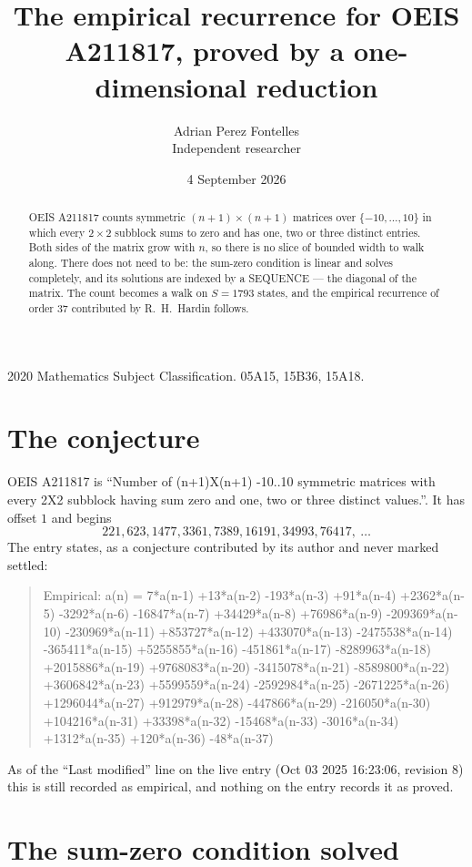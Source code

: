 \documentclass[11pt,a4paper]{article}
\title{The empirical recurrence for OEIS A211817, proved by a one-dimensional reduction}
\author{Adrian Perez Fontelles\\ \small Independent researcher}
\date{4 September 2026}
\theoremstyle{plain}
\theoremstyle{definition}
\begin{document}
\maketitle

\begin{abstract}
OEIS A211817 counts symmetric $(n+1)\times(n+1)$ matrices over
$\{-10,\dots,10\}$ in which every $2\times2$ subblock sums to zero and has one, two or three distinct
entries. Both sides of the matrix grow with $n$, so there is no slice of bounded width to walk
along. There does not need to be: the sum-zero condition is linear and solves completely, and
its solutions are indexed by a SEQUENCE --- the diagonal of the matrix. The count becomes a walk
on $S=1793$ states, and the empirical recurrence of order $37$ contributed by R.~H.~Hardin
follows.
\end{abstract}

\noindent\small 2020 Mathematics Subject Classification. 05A15, 15B36, 15A18.\normalsize

\section{The conjecture}

OEIS A211817 is ``Number of (n+1)X(n+1) -10..10 symmetric matrices with every 2X2 subblock having sum zero and one, two or three distinct values.''. It has offset $1$ and begins
\[
221, 623, 1477, 3361, 7389, 16191, 34993, 76417,\ \dots
\]
The entry states, as a conjecture contributed by its author and never marked settled:
\begin{quote}
Empirical: a(n) = 7*a(n-1) +13*a(n-2) -193*a(n-3) +91*a(n-4) +2362*a(n-5) -3292*a(n-6) -16847*a(n-7) +34429*a(n-8) +76986*a(n-9) -209369*a(n-10) -230969*a(n-11) +853727*a(n-12) +433070*a(n-13) -2475538*a(n-14) -365411*a(n-15) +5255855*a(n-16) -451861*a(n-17) -8289963*a(n-18) +2015886*a(n-19) +9768083*a(n-20) -3415078*a(n-21) -8589800*a(n-22) +3606842*a(n-23) +5599559*a(n-24) -2592984*a(n-25) -2671225*a(n-26) +1296044*a(n-27) +912979*a(n-28) -447866*a(n-29) -216050*a(n-30) +104216*a(n-31) +33398*a(n-32) -15468*a(n-33) -3016*a(n-34) +1312*a(n-35) +120*a(n-36) -48*a(n-37)
\end{quote}
As of the ``Last modified'' line on the live entry (Oct 03 2025 16:23:06, revision 8) this is still
recorded as empirical, and nothing on the entry records it as proved.

\section{The sum-zero condition solved}
\end{document}

